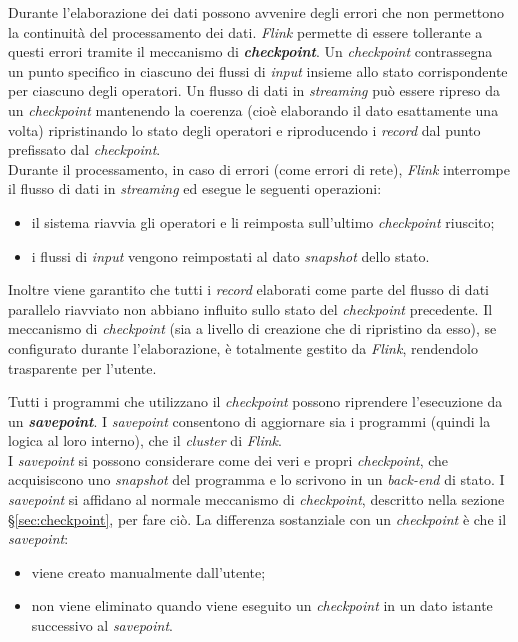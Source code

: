 \label{sec:checkpoint}
\noindent Durante l'elaborazione dei dati possono avvenire degli errori che non permettono la continuità del processamento dei dati. \textit{Flink} permette di essere tollerante a questi errori tramite il meccanismo di \textbf{\textit{checkpoint}}. Un \textit{checkpoint} contrassegna un punto specifico in ciascuno dei flussi di \textit{input} insieme allo stato corrispondente per ciascuno degli operatori. Un flusso di dati in \textit{streaming} può essere ripreso da un \textit{checkpoint} mantenendo la coerenza (cioè elaborando il dato esattamente una volta) ripristinando lo stato degli operatori e riproducendo i \textit{record} dal punto prefissato dal \textit{checkpoint}.\\
Durante il processamento, in caso di errori (come errori di rete), \textit{Flink} interrompe il flusso di dati in \textit{streaming} ed esegue le seguenti operazioni:
\begin{itemize}
	\item{il sistema riavvia gli operatori e li reimposta sull'ultimo \textit{checkpoint} riuscito;}
	\item{i flussi di \textit{input} vengono reimpostati al dato \textit{\gls{snapshot}} dello stato.}
\end{itemize}
Inoltre viene garantito che tutti i \textit{record} elaborati come parte del flusso di dati parallelo riavviato non abbiano influito sullo stato del \textit{checkpoint} precedente.
Il meccanismo di \textit{checkpoint} (sia a livello di creazione che di ripristino da esso), se configurato durante l'elaborazione, è totalmente gestito da \textit{Flink}, rendendolo trasparente per l'utente.

Tutti i programmi che utilizzano il \textit{checkpoint} possono riprendere l'esecuzione da un \textbf{\textit{savepoint}}. I \textit{savepoint} consentono di aggiornare sia i programmi (quindi la logica al loro interno), che il \textit{\gls{cluster}} di \textit{Flink}.\\
I \textit{savepoint} si possono considerare come dei veri e propri \textit{checkpoint}, che acquisiscono uno \textit{\gls{snapshot}} del programma e lo scrivono in un \textit{back-end} di stato. I \textit{savepoint} si affidano al normale meccanismo di \textit{checkpoint}, descritto nella sezione \S\ref{sec:checkpoint}, per fare ciò. La differenza sostanziale con un \textit{checkpoint} è che il \textit{savepoint}:
\begin{itemize}
	\item{viene creato manualmente dall'utente;}
	\item{non viene eliminato quando viene eseguito un \textit{checkpoint} in un dato istante successivo al \textit{savepoint}.}
\end{itemize}


